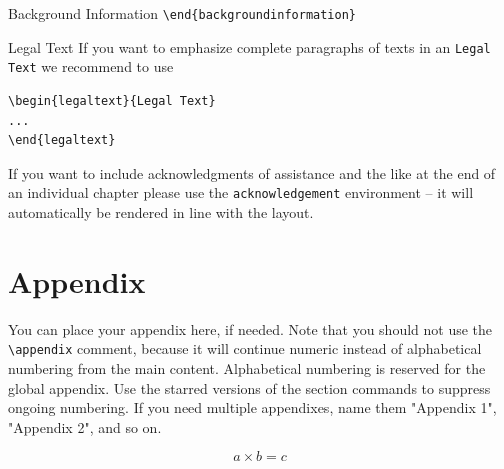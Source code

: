 \begin{bibunit}
\begin{backgroundinformation}{Background Information}
\verb|\end{backgroundinformation}|
\end{backgroundinformation}
\begin{legaltext}{Legal Text}
If you want to emphasize complete paragraphs of texts in an \verb|Legal Text| we recommend to
use  \begin{verbatim}\begin{legaltext}{Legal Text}
...
\end{legaltext}\end{verbatim}
\end{legaltext}
%
\begin{acknowledgement}
If you want to include acknowledgments of assistance and the like at the end of an individual chapter please use the \verb|acknowledgement| environment -- it will automatically be rendered in line with the layout.
\end{acknowledgement}
%

\section*{Appendix}\label{01:appendix}

You can place your appendix here, if needed. Note that you should not use the \verb|\appendix| comment, because it will continue numeric instead of alphabetical numbering from the main content. Alphabetical numbering is reserved for the global appendix. Use the starred versions of the section commands to suppress ongoing numbering. If you need multiple appendixes, name them "Appendix 1", "Appendix 2", and so on.

\begin{equation}
a \times b = c
\end{equation}



\putbib[bibliography]	%

\end{bibunit}
